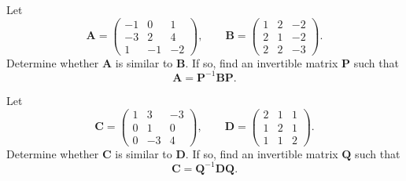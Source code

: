 \begin{problem}
\begin{problemsubparts}
\item Let
\[
\mathbf A=
\begin{pmatrix}
-1&0&1\\
-3&2&4\\
1&-1&-2
\end{pmatrix},
\qquad
\mathbf B=
\begin{pmatrix}
1&2&-2\\
2&1&-2\\
2&2&-3
\end{pmatrix}.
\]
Determine whether $\mathbf A$ is similar to $\mathbf B$. If so, find an invertible matrix $\mathbf P$ such that
\[
\mathbf A=\mathbf P^{-1}\mathbf B\mathbf P.
\]
\item Let
\[
\mathbf C=
\begin{pmatrix}
1&3&-3\\
0&1&0\\
0&-3&4
\end{pmatrix},
\qquad
\mathbf D=
\begin{pmatrix}
2&1&1\\
1&2&1\\
1&1&2
\end{pmatrix}.
\]
Determine whether $\mathbf C$ is similar to $\mathbf D$. If so, find an invertible matrix $\mathbf Q$ such that
\[
\mathbf C=\mathbf Q^{-1}\mathbf D\mathbf Q.
\]
\end{problemsubparts}
\end{problem}
